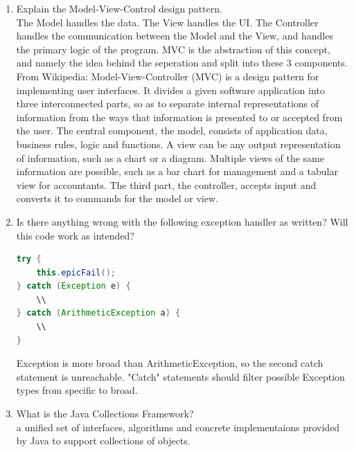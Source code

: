 \documentclass[11pt]{article}
\newenvironment{answer}{\large\lstset{basicstyle=\tiny\ttfamily}\color{white} }{}
\newenvironment{answer}{\large\lstset{basicstyle=\large\ttfamily}\color{red} }{}
\begin{document}
\begin{enumerate}
\newpage
\item Explain the Model-View-Control design pattern. \\
\begin{answer}
The Model handles the data. The View handles the UI. The Controller handles the communication between the Model and the View, and handles the primary logic of the program.
MVC is the abstraction of this concept, and namely the idea behind the seperation and split into these 3 components. From Wikipedia:
Model-View-Controller (MVC) is a design pattern for implementing user interfaces. It divides a given software application into three interconnected parts, so as to separate internal representations of information from the ways that information is presented to or accepted from the user. The central component, the model, consists of application data, business rules, logic and functions. A view can be any output representation of information, such as a chart or a diagram. Multiple views of the same information are possible, such as a bar chart for management and a tabular view for accountants. The third part, the controller, accepts input and converts it to commands for the model or view.
\end{answer}

\item Is there anything wrong with the following exception handler as written? Will this
code work as intended? 
\begin{lstlisting}[language=java]
try {
	this.epicFail();
} catch (Exception e) {
	\\
} catch (ArithmeticException a) {
	\\
}
\end{lstlisting}
\begin{answer}
Exception is more broad than ArithmeticException, so the second catch statement is unreachable.  "Catch" statements should filter possible Exception types from specific to broad.
\end{answer}



\item What is the Java Collections Framework? \\
\begin{answer}
    a unified set of interfaces, algorithms and concrete implementaions 
provided by Java to support collections of objects.
\end{answer}






\end{enumerate}
\end{document}
